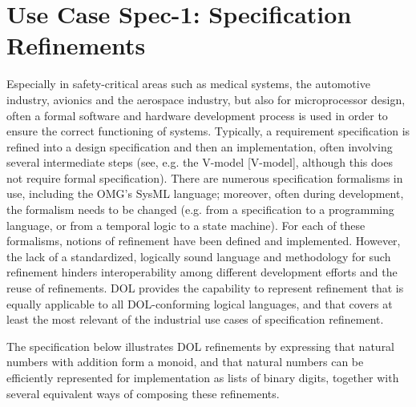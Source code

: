 \documentclass[10pt,fleqn,%
\ifpretendfinal
final%
\else
draft%
\fi,
]{scrreprt}
\begin{document}
\section{Use Case Spec-1: Specification Refinements}\label{spec-1}
Especially in safety-critical areas such as medical systems, the automotive industry, avionics and the aerospace industry, but also for microprocessor design, often 
a formal software and hardware development process is used in order to ensure the correct functioning of systems. Typically, a requirement specification is refined 
into a design specification and then an implementation, often involving several intermediate steps (see, e.g. the V-model [V-model], although this does not require 
formal specification).
There are numerous specification formalisms in use, including the OMG's SysML language; moreover, often during development, the formalism needs to be 
changed (e.g. from a specification to a programming language, or from a temporal logic to a state machine). For each of these formalisms, notions of refinement 
have been defined and implemented. However, the lack of a standardized, logically sound language and methodology for such refinement hinders interoperability 
among different development efforts and the reuse of refinements.
DOL  provides the capability to represent refinement that is equally applicable to all DOL-conforming logical languages, and that  
covers at least the most relevant of the industrial use cases of specification refinement.

The specification below illustrates DOL refinements by expressing that natural numbers with addition form a monoid, and that 
natural numbers can be efficiently represented for implementation as lists of binary digits, together with several equivalent
ways of composing these refinements.
\end{document}
